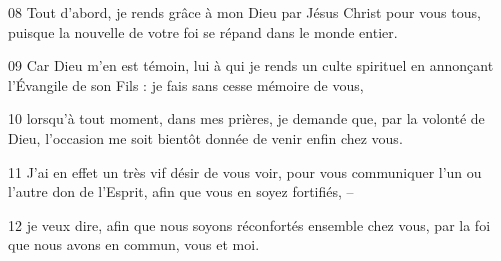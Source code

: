 
08 Tout d’abord, je rends grâce à mon Dieu par Jésus Christ pour vous tous, puisque la nouvelle de votre foi se répand dans le monde entier.

09 Car Dieu m’en est témoin, lui à qui je rends un culte spirituel en annonçant l’Évangile de son Fils : je fais sans cesse mémoire de vous,

10 lorsqu’à tout moment, dans mes prières, je demande que, par la volonté de Dieu, l’occasion me soit bientôt donnée de venir enfin chez vous.

11 J’ai en effet un très vif désir de vous voir, pour vous communiquer l’un ou l’autre don de l’Esprit, afin que vous en soyez fortifiés, –

12 je veux dire, afin que nous soyons réconfortés ensemble chez vous, par la foi que nous avons en commun, vous et moi.
